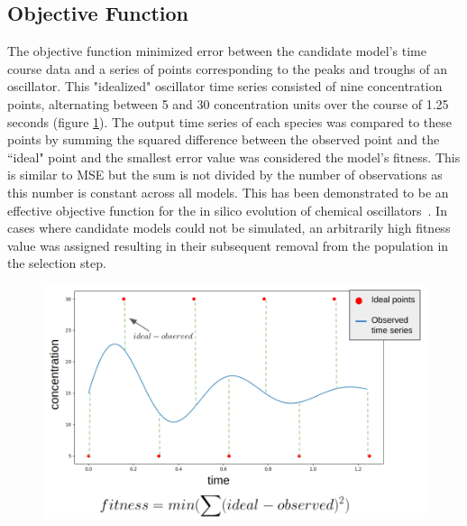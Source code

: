 \documentclass[12pt]{report}
\begin{document}
\subsection{Objective Function}

The objective function minimized error between the candidate model's time course data and a series of points corresponding to the peaks and troughs of an oscillator. This "idealized" oscillator time series consisted of nine concentration points, alternating between 5 and 30 concentration units over the course of 1.25 seconds (figure \ref{fig:fitness}). The output time series of each species was compared to these points by summing the squared difference between the observed point and the ``ideal" point and the smallest error value was considered the model's fitness. This is similar to MSE but the sum is not divided by the number of observations as this number is constant across all models. This has been demonstrated to be an effective objective function for the in silico evolution of chemical oscillators~\cite{Paladugu2006}.  In cases where candidate models could not be simulated, an arbitrarily high fitness value was assigned resulting in their subsequent removal from the population in the selection step.  

\begin{figure}
    \centering
    \includegraphics[width=15cm]{images/fitness.png}
    \label{fig:fitness}
\end{figure}
\end{document}
